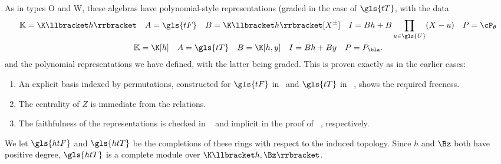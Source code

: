 As in types O and W, these algebras have polynomial-style
representations (graded in the case of $\gls{tT}$, with the data
\begin{gather*}%
\mathbb{K}=\K\llbracket h\rrbracket \quad A=\gls{tF}\quad
 B=\K\llbracket h\rrbracket [X^{\pm}]\quad I=Bh+B\prod_{u\in \gls{U}}(X-u)\quad P=\cP_{\theta}%
\\
\mathbb{K}=\K[h]\quad A=\gls{tT} \quad
 B=\K[h,y]\quad I=Bh+By \quad P=P_{\bla}.%
\end{gather*}
and the polynomial representations we have defined, with the latter
being graded. This is proven exactly as in the earlier cases:
\begin{enumerate}
\item An explicit basis indexed by permutations, constructed for
 $\gls{tF}$ in~\cite[Prop.~1.15]{MS18} and $\gls{tT} $ in
~\cite[Prop.~4.16]{Webmerged}, shows the required freeness.
 \item The
 centrality of $Z$ is immediate from the relations.
 \item The
 faithfulness of the representations is checked in
~\cite[Prop.~1.11]{MS18} and implicit in the proof of
~\cite[Prop.~4.16]{Webmerged}, respectively.
\end{enumerate}



 We let $\gls{htF}$ and 
 $\gls{htT}$ be the completions of these rings with respect to the
 induced topology. Since $h$ and $\Bz$ both have positive
 degree, $\gls{htT}$ is a complete module over $\K\llbracket h,\Bz\rrbracket $.

